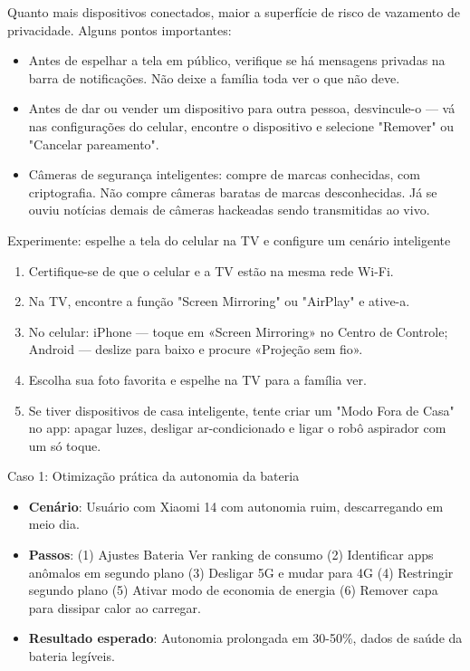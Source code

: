 
Quanto mais dispositivos conectados, maior a superfície de risco de vazamento de privacidade. Alguns pontos importantes:

\begin{itemize}
  \item Antes de espelhar a tela em público, verifique se há mensagens privadas na barra de notificações. Não deixe a família toda ver o que não deve.
  \item Antes de dar ou vender um dispositivo para outra pessoa, desvincule-o — vá nas configurações do celular, encontre o dispositivo e selecione "Remover" ou "Cancelar pareamento".
  \item Câmeras de segurança inteligentes: compre de marcas conhecidas, com criptografia. Não compre câmeras baratas de marcas desconhecidas. Já se ouviu notícias demais de câmeras hackeadas sendo transmitidas ao vivo.
\end{itemize}

\begin{tcbpractice}{Experimente: espelhe a tela do celular na TV e configure um cenário inteligente}
\begin{enumerate}
  \item Certifique-se de que o celular e a TV estão na mesma rede Wi-Fi.
  \item Na TV, encontre a função "Screen Mirroring" ou "AirPlay" e ative-a.
  \item No celular: iPhone — toque em «Screen Mirroring» no Centro de Controle; Android — deslize para baixo e procure «Projeção sem fio».
  \item Escolha sua foto favorita e espelhe na TV para a família ver.
  \item Se tiver dispositivos de casa inteligente, tente criar um "Modo Fora de Casa" no app: apagar luzes, desligar ar-condicionado e ligar o robô aspirador com um só toque.
\end{enumerate}

\end{tcbpractice}

\begin{tcbinfo}{Caso 1: Otimização prática da autonomia da bateria}
\begin{itemize}
  \item \textbf{Cenário}: Usuário com Xiaomi 14 com autonomia ruim, descarregando em meio dia.
  \item \textbf{Passos}: (1) Ajustes Bateria Ver ranking de consumo (2) Identificar apps anômalos em segundo plano (3) Desligar 5G e mudar para 4G (4) Restringir segundo plano (5) Ativar modo de economia de energia (6) Remover capa para dissipar calor ao carregar.
  \item \textbf{Resultado esperado}: Autonomia prolongada em 30-50\%, dados de saúde da bateria legíveis.
\end{itemize}

\end{tcbinfo}
